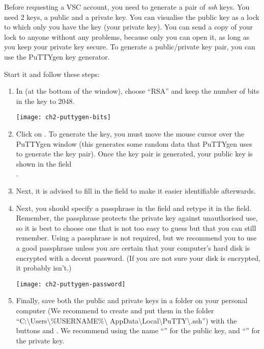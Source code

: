   Before requesting a VSC account, you need to generate a pair of \emph{ssh}
  keys. You need 2 keys, a public and a private key. You can visualise the public
  key as a lock to which only you have the key (your private key). You can send
  a copy of your lock to anyone without any problems, because only you can
  open it, as long as you keep your private key secure.
  To generate a public/private key pair, you can use the PuTTYgen key generator.

  Start  it and follow these steps:

  \begin{enumerate}
    \item  In  (at the bottom of the window), choose
      ``RSA'' and keep the number of bits in the key to 2048.

    \begin{center}
    \texttt{[image: ch2-puttygen-bits]}
    \end{center}

    \item  Click on . To generate the key, you must move
      the mouse cursor over the PuTTYgen window (this generates some random
      data that PuTTYgen uses to generate the key pair). Once the key pair is
      generated, your public key is shown in the field \\
      .
    \item  Next, it is advised to fill in the  field
      to make it easier identifiable afterwards.
    \item  Next, you should specify a passphrase in the 
      field and retype it in the  field.
      Remember, the passphrase protects the private key against unauthorised
      use, so it is best to choose one that is not too easy to guess but that
      you can still remember.
      Using a passphrase is not required, but we recommend you to use a good
      passphrase unless you are certain that your computer's hard disk is
      encrypted with a decent password. (If you are not sure your disk is
      encrypted, it probably isn't.)

    \begin{center}
    \texttt{[image: ch2-puttygen-password]}
    \end{center}

    \item  Finally, save both the public and private keys in a folder on your
      personal computer (We recommend to create and put them in the folder
      ``C:\textbackslash Users\textbackslash \%USERNAME\%\textbackslash
      AppData\textbackslash Local\textbackslash PuTTY\textbackslash .ssh'')
      with the buttons  and .
      We recommend using the name ``'' for the public key,
      and ``'' for the private key.
  \end{enumerate}


